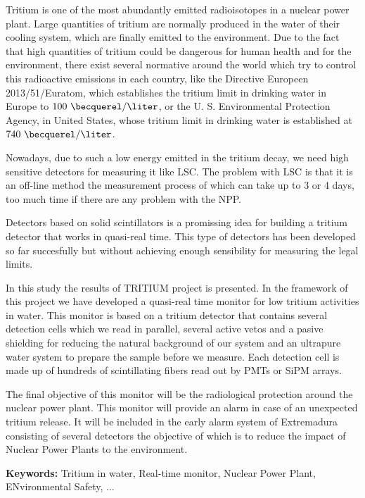 Tritium is one of the most abundantly emitted radioisotopes in a nuclear power plant. Large quantities of tritium are normally produced in the water of their cooling system, which are finally emitted to the environment. Due to the fact that high quantities of tritium could be dangerous for human health and for the environment, there exist several normative around the world which try to control this radioactive emissions in each country, like the Directive Europeen 2013/51/Euratom, which establishes the tritium limit in drinking water in Europe to $100~\becquerel/\liter$, or the U. S. Environmental Protection Agency, in United States, whose tritium limit in drinking water is established at $740~\becquerel/\liter$.

Nowadays, due to such a low energy emitted in the tritium decay, we need high sensitive detectors for measuring it like LSC. The problem with LSC is that it is an off-line method the measurement process of which can take up to 3 or 4 days, too much time if there are any problem with the NPP.

Detectors based on solid scintillators is a promissing idea for building a tritium detector that works in quasi-real time. This type of detectors has been developed so far succesfully but without achieving enough sensibility for measuring the legal limits.

In this study the results of TRITIUM project is presented. In the framework of this project we have developed a quasi-real time monitor for low tritium activities in water. This monitor is based on a tritium detector that contains several detection cells which we read in parallel, several active vetos and a pasive shielding for reducing the natural background of our system and an ultrapure water system to prepare the sample before we measure. Each detection cell is made up of hundreds of scintillating fibers read out by PMTs or SiPM arrays.

The final objective of this monitor will be the radiological protection around the nuclear power plant. This monitor will provide an alarm in case of an unexpected tritium release. It will be included in the early alarm system of Extremadura consisting of several detectors the objective of which is to reduce the impact of Nuclear Power Plants to the environment.

\vspace{1cm}

\textbf{Keywords:} Tritium in water, Real-time monitor, Nuclear Power Plant, ENvironmental Safety, ...